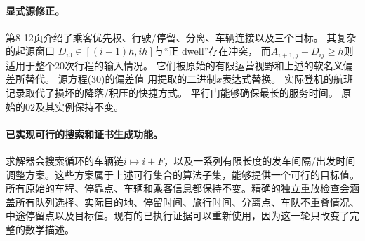 \documentclass[11pt]{article}
\begin{document}
\paragraph{显式源修正。}
第8-12页介绍了乘客优先权、行驶/停留、分离、车辆连接以及三个目标。 其复杂的起源窗口
$D_{i0}\in[(i-1)h,ih]$与“正 dwell”存在冲突，
而$A_{i+1,j}-D_{ij}\ge h$则适用于整个$20$次行程的输入情况。
它们被原始的有限运营视野和上述的软名义偏差所替代。 源方程(30)的偏差值
用提取的二进制$x$表达式替换。 实际登机的航班记录取代了损坏的降落/积压的快捷方式。 平行门能够确保最长的服务时间。 原始的02及其实例保持不变。

\paragraph{已实现可行的搜索和证书生成功能。}
求解器会搜索循环的车辆链$i\mapsto i+F$，以及一系列有限长度的发车间隔/出发时间调整方案。这些方案属于上述可行集合的算法子集，能够提供一个可行的目标值。所有原始的车程、停靠点、车辆和乘客信息都保持不变。精确的独立重放检查会涵盖所有队列选择、实际目的地、停留时间、旅行时间、分离点、车队不重叠情况、中途停留点以及目标值。现有的已执行证据可以重新使用，因为这一轮只改变了完整的数学描述。
\end{document}
